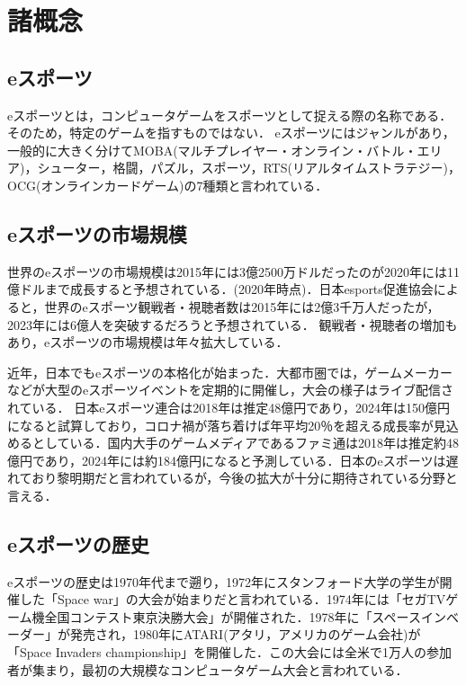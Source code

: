 \section{諸概念}

\subsection{eスポーツ}

eスポーツとは，コンピュータゲームをスポーツとして捉える際の名称である．そのため，特定のゲームを指すものではない．%
eスポーツにはジャンルがあり，一般的に大きく分けてMOBA(マルチプレイヤー・オンライン・バトル・エリア)，シューター，格闘，パズル，スポーツ，RTS(リアルタイムストラテジー)，OCG(オンラインカードゲーム)の7種類と言われている．

\subsection{eスポーツの市場規模}

世界のeスポーツの市場規模は2015年には3億2500万ドルだったのが2020年には11億ドルまで成長すると予想されている．(2020年時点)．日本esports促進協会によると，世界のeスポーツ観戦者・視聴者数は2015年には2億3千万人だったが，2023年には6億人を突破するだろうと予想されている．%
観戦者・視聴者の増加もあり，eスポーツの市場規模は年々拡大している．

近年，日本でもeスポーツの本格化が始まった．大都市圏では，ゲームメーカーなどが大型のeスポーツイベントを定期的に開催し，大会の様子はライブ配信されている．%
日本eスポーツ連合は2018年は推定48億円であり，2024年は150億円になると試算しており，コロナ禍が落ち着けば年平均20％を超える成長率が見込めるとしている．国内大手のゲームメディアであるファミ通は2018年は推定約48億円であり，2024年には約184億円になると予測している．日本のeスポーツは遅れており黎明期だと言われているが，今後の拡大が十分に期待されている分野と言える．

\subsection{eスポーツの歴史}

eスポーツの歴史は1970年代まで遡り，1972年にスタンフォード大学の学生が開催した「Space war」の大会が始まりだと言われている．1974年には「セガTVゲーム機全国コンテスト東京決勝大会」が開催された．1978年に「スペースインベーダー」が発売され，1980年にATARI(アタリ，アメリカのゲーム会社)が「Space Invaders championship」を開催した．この大会には全米で1万人の参加者が集まり，最初の大規模なコンピュータゲーム大会と言われている．

